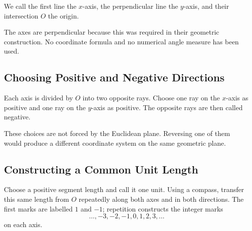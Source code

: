 We call the first line the $x$-axis, the perpendicular line the $y$-axis, and
their intersection $O$ the origin.

\begin{center}
\end{center}

The axes are perpendicular because this was required in their geometric
construction. No coordinate formula and no numerical angle measure has been
used.

\subsection{Choosing Positive and Negative Directions}

Each axis is divided by $O$ into two opposite rays. Choose one ray on the
$x$-axis as positive and one ray on the $y$-axis as positive. The opposite rays
are then called negative.

These choices are not forced by the Euclidean plane. Reversing one of them would
produce a different coordinate system on the same geometric plane.

\begin{center}
\end{center}

\subsection{Constructing a Common Unit Length}

Choose a positive segment length and call it one unit. Using a compass, transfer
this same length from $O$ repeatedly along both axes and in both directions.
The first marks are labelled $1$ and $-1$; repetition constructs the integer
marks
\[
\ldots,-3,-2,-1,0,1,2,3,\ldots
\]
on each axis.

